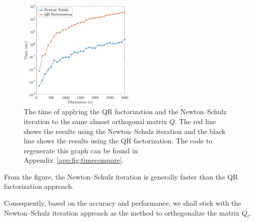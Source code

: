\begin{figure}[ht]
\centering
\includegraphics[width=0.5\textwidth]{figs/timecompare.pdf}
\caption[The time of applying the QR factorization and the Newton--Schulz iteration to the same almost orthogonal matrix $Q$ with respect to the dimension $(n)$.]{The time of applying the QR factorization and the Newton--Schulz iteration to the same almost orthogonal matrix $Q$. The red line shows the results using the Newton--Schulz iteration and the black line shows the results using the QR factorization. The code to regenerate this graph can be found in Appendix~\ref{app:fig:timecompare}.}
\label{fig:timecompare}
\end{figure}



From the figure, the Newton--Schulz iteration is generally faster than the QR factorization approach. 

Consequently, based on the accuracy and performance, we shall stick with the Newton--Schulz iteration approach as the method to orthogonalize the matrix $Q_\ell$.
